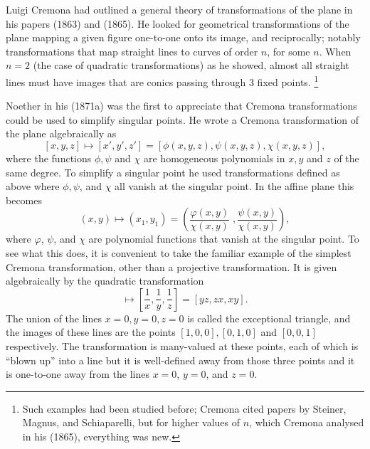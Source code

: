 Luigi Cremona
%
had  outlined a general theory of transformations of
the plane in his papers (1863) and (1865). He looked for geometrical
transformations of the plane mapping a given figure one-to-one onto its
image, and reciprocally; notably  transformations that map straight lines
to curves of order $n$, for some $n$. When $n=2$ (the case of quadratic
transformations)  as he showed, almost all straight lines must have
images that are conics passing through 3 fixed points.%
%
\footnote{Such
examples had been studied before; Cremona  cited papers by Steiner,
%
%
Magnus, and Schiaparelli,
%
 but for higher values of $n$, which Cremona
analysed in his (1865), everything was new.}



Noether in his (1871a) was the first to appreciate that Cremona
transformations could be used to simplify singular points.  He wrote a
Cremona transformation of the plane algebraically as
$$
[x,y,z] \mapsto [x',y',z'] = [\phi (x,y,z), \psi (x, y, z),  \chi (x,
y, z)],
$$
where the functions $\phi, \psi$ and $\chi$ are homogeneous polynomials
in $x, y$ and $z$ of the same degree. To simplify a singular point he used
transformations defined as above where $\phi, \psi$, and $\chi$ all
vanish at the singular point.  In the affine plane this becomes
$$(x , y) \mapsto (x_1 , y_1) = \left(\frac{\varphi (x, y)}{\chi (x,
y)}\;,  \frac{\psi (x, y)}{\chi (x, y)} \right),$$
where $\varphi$, $\psi$, and $\chi$ are polynomial functions that vanish
at the singular point.  To see what this does, it is convenient to take
the familiar example of
the simplest  Cremona transformation,
%
 other than a projective
transformation. It  is given algebraically by  the quadratic
transformation
\begin{equation*}
[x, y, z] \mapsto \left[\frac{1}{x}, \frac{1}{y}, \frac{1}{z}\right] =
[yz, zx, xy]
.
\end{equation*}
The union of the lines $x=0,y=0,z=0$ is called the exceptional triangle,
and the images of these lines are the points $[1, 0, 0], [0, 1, 0]$
and $[0, 0, 1]$ respectively.
The transformation is many-valued at these points, each of which is
%
``blown up'' into a line  but it is well-defined away from those three
points and it is  one-to-one away from  the lines $x=0$, $y=0$, and $z
= 0$.


